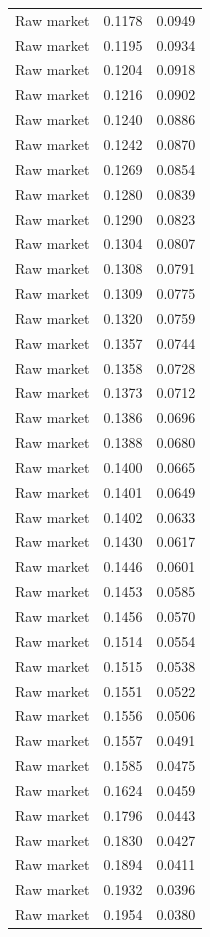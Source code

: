 \begin{table}[htbp]
\begin{tabular}{lll}
Raw market & 0.1178 & 0.0949 \\
Raw market & 0.1195 & 0.0934 \\
Raw market & 0.1204 & 0.0918 \\
Raw market & 0.1216 & 0.0902 \\
Raw market & 0.1240 & 0.0886 \\
Raw market & 0.1242 & 0.0870 \\
Raw market & 0.1269 & 0.0854 \\
Raw market & 0.1280 & 0.0839 \\
Raw market & 0.1290 & 0.0823 \\
Raw market & 0.1304 & 0.0807 \\
Raw market & 0.1308 & 0.0791 \\
Raw market & 0.1309 & 0.0775 \\
Raw market & 0.1320 & 0.0759 \\
Raw market & 0.1357 & 0.0744 \\
Raw market & 0.1358 & 0.0728 \\
Raw market & 0.1373 & 0.0712 \\
Raw market & 0.1386 & 0.0696 \\
Raw market & 0.1388 & 0.0680 \\
Raw market & 0.1400 & 0.0665 \\
Raw market & 0.1401 & 0.0649 \\
Raw market & 0.1402 & 0.0633 \\
Raw market & 0.1430 & 0.0617 \\
Raw market & 0.1446 & 0.0601 \\
Raw market & 0.1453 & 0.0585 \\
Raw market & 0.1456 & 0.0570 \\
Raw market & 0.1514 & 0.0554 \\
Raw market & 0.1515 & 0.0538 \\
Raw market & 0.1551 & 0.0522 \\
Raw market & 0.1556 & 0.0506 \\
Raw market & 0.1557 & 0.0491 \\
Raw market & 0.1585 & 0.0475 \\
Raw market & 0.1624 & 0.0459 \\
Raw market & 0.1796 & 0.0443 \\
Raw market & 0.1830 & 0.0427 \\
Raw market & 0.1894 & 0.0411 \\
Raw market & 0.1932 & 0.0396 \\
Raw market & 0.1954 & 0.0380 \\

\end{tabular}
\end{table}
